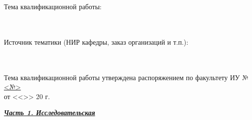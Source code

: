 \documentclass[utf8x, 14pt, oneside, a4paper]{article}
\begin{document}
	\begin{flushleft}
		\fontsize{12pt}{\baselineskip}\selectfont

		Тема квалификационной работы: \uline{ \hfill}
		\\ \uline{ \hfill}
		\\ \uline{ \hfill}
		\\ \uline{ \hfill}
	\end{flushleft}

	\vfill

	\begin{flushleft}
		\fontsize{12pt}{\baselineskip}\selectfont

		Источник тематики (НИР кафедры, заказ организаций и т.п.): 
		\\ \uline{\hfill}
		\\ \uline{\hfill}
		\\ \uline{\hfill}
	\end{flushleft}

	\vfill

	\begin{flushleft}
		\fontsize{12pt}{\baselineskip}\selectfont
		Тема квалификационной работы утверждена распоряжением по факультету ИУ № \uline{\hfill <№> \hfill}
		\\ от <<\uline{\hspace*{5mm}}>> \uline{\hspace*{2.5cm}} 20\uline{\hspace*{5mm}} г.
	\end{flushleft}

	\vfill

	\begin{flushleft}
		\fontsize{12pt}{\baselineskip}\selectfont

		\textbf{\uline{\textit{Часть 1. Исследовательская}}}
		
		\uline{\hfill}
		
		\uline{\hfill}
		
		\uline{\hfill}

		\uline{\hfill}

		\uline{\hfill}

		\uline{\hfill}

		\uline{\hfill}

		\uline{\hfill}

		\uline{\hfill}
	\end{flushleft}

	\pagebreak

	\thispagestyle{empty}
\end{document}
